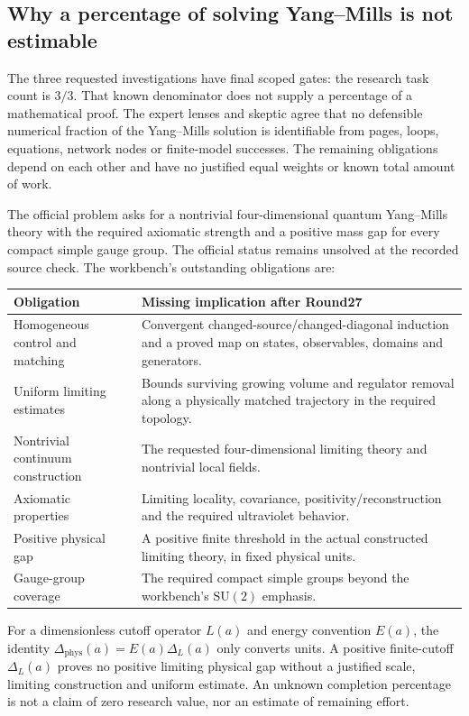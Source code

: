 \subsection{Why a percentage of solving Yang--Mills is not estimable}
The three requested investigations have final scoped gates: the research task count is $3/3$. That known denominator does not supply a percentage of a mathematical proof. The expert lenses and skeptic agree that no defensible numerical fraction of the Yang--Mills solution is identifiable from pages, loops, equations, network nodes or finite-model successes. The remaining obligations depend on each other and have no justified equal weights or known total amount of work.

The official problem asks for a nontrivial four-dimensional quantum Yang--Mills theory with the required axiomatic strength and a positive mass gap for every compact simple gauge group. The official status remains unsolved at the recorded source check. The workbench's outstanding obligations are:
\begin{center}\small
\begin{tabularx}{\textwidth}{@{}p{48mm}X@{}}
\toprule Obligation & Missing implication after Round27 \\
\midrule
Homogeneous control and matching & Convergent changed-source/changed-diagonal induction and a proved map on states, observables, domains and generators. \\
Uniform limiting estimates & Bounds surviving growing volume and regulator removal along a physically matched trajectory in the required topology. \\
Nontrivial continuum construction & The requested four-dimensional limiting theory and nontrivial local fields. \\
Axiomatic properties & Limiting locality, covariance, positivity/reconstruction and the required ultraviolet behavior. \\
Positive physical gap & A positive finite threshold in the actual constructed limiting theory, in fixed physical units. \\
Gauge-group coverage & The required compact simple groups beyond the workbench's $\mathrm{SU}(2)$ emphasis. \\
\bottomrule
\end{tabularx}
\end{center}
For a dimensionless cutoff operator $L(a)$ and energy convention $E(a)$, the identity
$\Delta_{\mathrm{phys}}(a)=E(a)\Delta_L(a)$ only converts units. A positive finite-cutoff $\Delta_L(a)$ proves no positive limiting physical gap without a justified scale, limiting construction and uniform estimate. An unknown completion percentage is not a claim of zero research value, nor an estimate of remaining effort.

